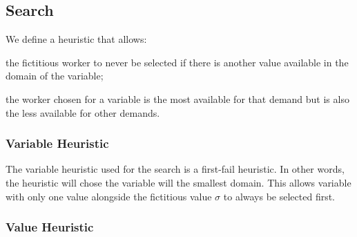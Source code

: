 \documentclass[../../thesis.tex]{subfiles}
\begin{document}





\subsection{Search}

We define a heuristic that allows:
\begin{enumerate*}[label=(\roman*)]
  \item the fictitious worker to never be selected if there is another value available in the domain of the variable;
  \item the worker chosen for a variable is the most available for that demand but is also the less available for other demands.
\end{enumerate*}

\subsubsection{Variable Heuristic}

The variable heuristic used for the search is a first-fail heuristic. In other words, the heuristic 
will chose the variable will the smallest domain. This allows variable with only one value alongside the 
fictitious value $\sigma$ to always be selected first.

\subsubsection{Value Heuristic}
\end{document}
